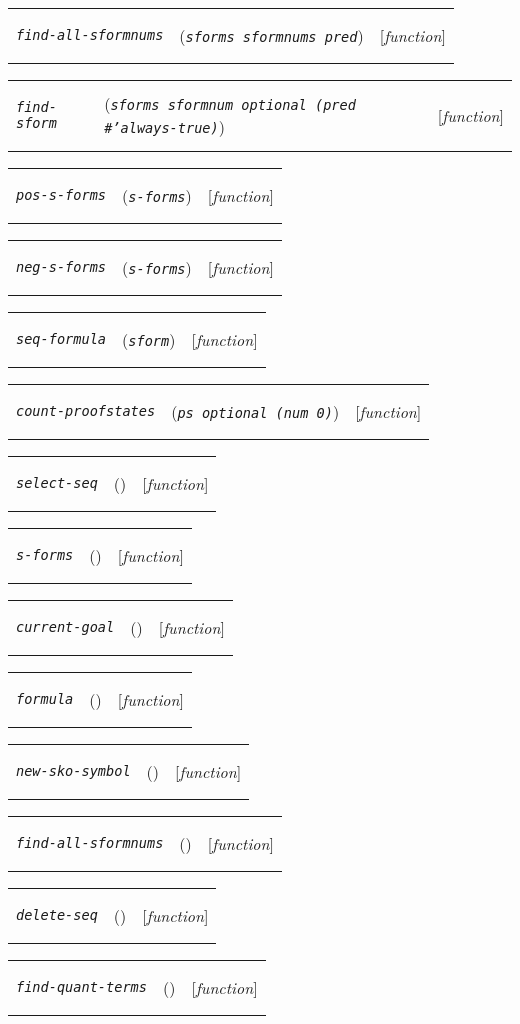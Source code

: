 \documentclass[12pt]{book}
\makeatletter
\def\ampoptional{{\smaller\sc {\smaller\smaller \&}optional\ }}
\newenvironment{function}[3]%
{\par\noindent\begin{boxedminipage}{\textwidth}%
 \par\noindent\begin{tabularx}{\linewidth}{l>{\raggedright}Xr}%
 \functionhtgt{#1}&(\texttt{\textit{#2}})&[\emph{#3}]%
 \end{tabularx}\par\flushright\begin{minipage}{.97\textwidth}}
{\end{minipage}\end{boxedminipage}}
\newcommand{\functionnm}[1]{\texttt{\textit{#1}}}
\newcommand{\functionhtgt}[1]{\hypertarget{#1}{\functionnm{#1}}\index{#1@\functionnm{#1}|underline}}
\newenvironment{lispfunction}[2]%
{\begin{function}{#1}{#2}{function}}{\end{function}}
\makeatother
\begin{document}
\begin{lispfunction}{find-all-sformnums}{sforms sformnums pred}
\end{lispfunction}

\begin{lispfunction}{find-sform}
  {sforms sformnum \ampoptional \textup{(}pred \textup{\#'always-true}\textup{)}}
\end{lispfunction}

\begin{lispfunction}{pos-s-forms}{s-forms}
\end{lispfunction}

\begin{lispfunction}{neg-s-forms}{s-forms}
\end{lispfunction}

\begin{lispfunction}{seq-formula}{sform}
\end{lispfunction}

\begin{lispfunction}{count-proofstates}{ps \ampoptional \textup{(}num \textup{0}\textup{)}}
\end{lispfunction}

\begin{lispfunction}{select-seq}{}
\end{lispfunction}

\begin{lispfunction}{s-forms}{}
\end{lispfunction}

\begin{lispfunction}{current-goal}{}
\end{lispfunction}

\begin{lispfunction}{formula}{}
\end{lispfunction}

\begin{lispfunction}{new-sko-symbol}{}
\end{lispfunction}

\begin{lispfunction}{find-all-sformnums}{}
\end{lispfunction}

\begin{lispfunction}{delete-seq}{}
\end{lispfunction}

\begin{lispfunction}{find-quant-terms}{}
\end{lispfunction}
\end{document}
